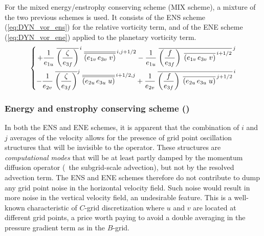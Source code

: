 \documentclass[../main/NEMO_manual]{subfiles}
\begin{document}
For the mixed energy/enstrophy conserving scheme (MIX scheme), a mixture of the two previous schemes is used.
It consists of the ENS scheme (\autoref{eq:DYN_vor_ens}) for the relative vorticity term,
and of the ENE scheme (\autoref{eq:DYN_vor_ene}) applied to the planetary vorticity term.
\[
  \left\{ {
      \begin{aligned}
        {+\frac{1}{e_{1u} }\; {\overline {\left( {\frac{\zeta }{e_{3f} }} \right)} }^{\,i}
          \; {\overline{\overline {\left( {e_{1v}\,e_{3v}\;v} \right)}} }^{\,i,j+1/2} -\frac{1}{e_{1u} }
          \; {\overline {\left( {\frac{f}{e_{3f} }} \right)
              \;\overline {\left( {e_{1v}\,e_{3v}\;v} \right)} ^{\,i+1/2}} }^{\,j} } \\
        {-\frac{1}{e_{2v} }\; {\overline {\left( {\frac{\zeta }{e_{3f} }} \right)} }^j
          \; {\overline{\overline {\left( {e_{2u}\,e_{3u}\;u} \right)}} }^{\,i+1/2,j} +\frac{1}{e_{2v} }
          \; {\overline {\left( {\frac{f}{e_{3f} }} \right)
              \;\overline {\left( {e_{2u}\,e_{3u}\;u} \right)} ^{\,j+1/2}} }^{\,i} } \hfill
      \end{aligned}
    } \right.
\]

\subsubsection[Energy and enstrophy conserving scheme (\forcode{ln_dynvor_een})]{Energy and enstrophy conserving scheme (\protect{})}
\label{subsec:DYN_vor_een}

In both the ENS and ENE schemes,
it is apparent that the combination of $i$ and $j$ averages of the velocity allows for
the presence of grid point oscillation structures that will be invisible to the operator.
These structures are \textit{computational modes} that will be at least partly damped by
the momentum diffusion operator (\ie\ the subgrid-scale advection), but not by the resolved advection term.
The ENS and ENE schemes therefore do not contribute to dump any grid point noise in the horizontal velocity field.
Such noise would result in more noise in the vertical velocity field, an undesirable feature.
This is a well-known characteristic of $C$-grid discretization where
$u$ and $v$ are located at different grid points,
a price worth paying to avoid a double averaging in the pressure gradient term as in the $B$-grid.
\end{document}
